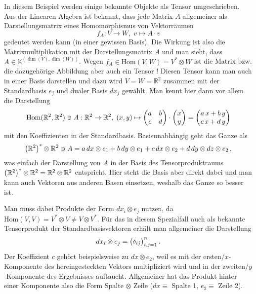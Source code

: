 \documentclass[../H_Analysis_main.tex]{subfiles}
\begin{document}
\begin{bsp}
In diesem Beispiel werden einige bekannte Objekte als Tensor umgeschrieben.\\

Aus der Linearen Algebra ist bekannt, dass jede Matrix $A$ allgemeiner als Darstellungsmatrix eines Homomorphismus von Vektorräumen
\begin{equation}
f_A: V \rightarrow W, \; v \mapsto A \cdot v
\end{equation}
gedeutet werden kann (in einer gewissen Basis). Die Wirkung ist also die Matrixmultiplikation mit der Darstellungsmatrix $A$ und man sieht, dass $A \in \mathbb{K}^{(\dim(V), \dim(W))}$. Wegen $f_A \in \text{Hom}(V, W) = V^* \otimes W$ ist die Matrix bzw. die dazugehörige Abbildung aber auch ein Tensor ! Diesen Tensor kann man auch in einer Basis darstellen und dazu wird $V = W = \mathbb{R}^2$ zusammen mit der Standardbasis $e_j$ und dualer Basis $dx_j$ gewählt. Man kennt hier dann vor allem die Darstellung
\begin{equation}
\text{Hom}(\mathbb{R}^2, \mathbb{R}^2) \ni A: \mathbb{R}^2 \rightarrow \mathbb{R}^2, \; (x, y) \mapsto \mqty(a & b \\ c & d) \cdot \mqty(x \\ y) = \mqty(a \, x + b \, y \\ c \, x + d \, y)
\end{equation}
mit den Koeffizienten in der Standardbasis. Basisunabhängig geht das Ganze als
\begin{equation}
\qty(\mathbb{R}^2)^* \otimes \mathbb{R}^2 \ni A= a \, dx \otimes e_1 + b \, dy \otimes e_1 + c \, dx \otimes e_2 + d \, dy \otimes dz \otimes e_2 \, ,
\end{equation}
was einfach der Darstellung von $A$ in der Basis des Tensorproduktraums $\qty(\mathbb{R}^2)^* \otimes \mathbb{R}^2 = \mathbb{R}^2 \otimes \mathbb{R}^2$ entspricht. Hier steht die Basis aber direkt dabei und man kann auch Vektoren aus anderen Basen einsetzen, weshalb das Ganze so besser ist.

Man muss dabei Produkte der Form $dx_i \otimes e_j$ nutzen, da $\text{Hom}(V, V) = V^* \otimes V \neq V \otimes V^*$. Für das in diesem Spezialfall auch als  bekannte Tensorprodukt der Standardbasisvektoren erhält man allgemeiner die Darstellung
\begin{equation}
dx_i \otimes e_j = \mqty(\delta_{ij})_{i, j = 1}^n \, .
\end{equation}
Der Koeffizient $c$ gehört beispielsweise zu $dx \otimes e_2$, weil es mit der ersten/$x$-Komponente des hereingesteckten Vektors multipliziert wird und in der zweiten/$y$-Komponente des Ergebnisses auftaucht. Allgemeiner hat das Produkt hinter einer Komponente also die Form Spalte $\otimes$ Zeile ($dx \equiv$ Spalte 1, $e_2 \equiv$ Zeile 2).\\



\end{bsp}
\end{document}
